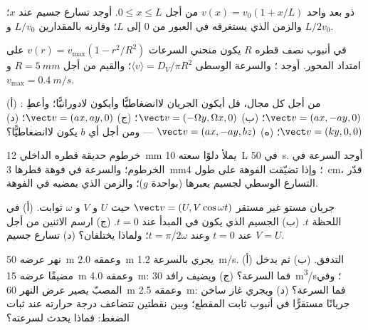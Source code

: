 \begin{exercise}[$\star$]\label{exo:b2:fluid-kinematics:2}
 ذو بعد واحد $v(x) = v_0(1 + x/L)$ من أجل $0 \le x \le L$.
أوجد تسارع جسيم عند $x$؛ والزمن الذي يستغرقه في العبور من $0$ إلى
$L$؛ وقارنه بالمقدارين $L/v_0$ و $L/2v_0$.
\end{exercise}

\begin{exercise}[$\star$]\label{exo:b2:fluid-kinematics:3}
في أنبوب نصف قطره $R$ يكون منحني السرعات $v(r) = v_{\max}(1 -
r^2/R^2)$ على امتداد المحور. أوجد ؛ والسرعة الوسطى $\langle v\rangle
= D_V/\pi R^2$؛ والقيم من أجل $R = \qty{5}{mm}$ و $v_{\max} = \qty{0.4}{m/s}$.
\end{exercise}

\begin{exercise}[$\star$]\label{exo:b2:fluid-kinematics:4}
من أجل كل مجال، قل أيكون الجريان لاانضغاطيًّا وأيكون
لادورانيًّا؛ وأعطِ : (أ) $\vect v = (ax, -ay, 0)$؛ (ب)
$\vect v = (-\Omega y, \Omega x, 0)$؛ (ج) $\vect v = (ax, ay, 0)$؛ (د) $\vect v =
(ky, 0, 0)$؛ (ه) $\vect v = (ax, -ay, bz)$ --- ومن أجل أي $b$ يكون
لاانضغاطيًّا؟
\end{exercise}

\begin{exercise}[$\star\star$]\label{exo:b2:fluid-kinematics:5}
خرطوم حديقة قطره الداخلي \qty{12}{mm} يملأ دلوًا سعته \qty{10}{L} في
\qty{50}{s}. أوجد السرعة في الخرطوم؛ والسرعة في فوهة قطرها
\qty{3}{mm}؛ وإذا تضيّقت الفوهة على طول \qty{4}{cm}، قدّر التسارع
الوسطي لجسيم يعبرها (بواحدة $g$)؛ والزمن الذي يمضيه في الفوهة.
\end{exercise}

\begin{exercise}[$\star\star$]\label{exo:b2:fluid-kinematics:6}
جريان مستو غير مستقر $\vect v = (U, V\cos\omega t)$ حيث $U$ و $V$ و $\omega$
ثوابت. (أ)  في اللحظة $t$. (ب)  الجسيم الذي
يكون في المبدأ عند $t = 0$. (ج) ارسم الاثنين من أجل $V = U$ عند $t = 0$
وعند $t = \pi/2\omega$؛ ولماذا يختلفان؟ (د) تسارع جسيم.
\end{exercise}

\begin{exercise}[$\star\star$]\label{exo:b2:fluid-kinematics:7}
نهر عرضه \qty{50}{m} وعمقه \qty{2.0}{m} يجري بالسرعة \qty{1.2}{m/s}. (أ)
التدفق. (ب) ثم يدخل مضيقًا عرضه \qty{15}{m} وعمقه \qty{4.0}{m}: فما
السرعة؟ (ج) ويضيف رافد \qty{30}{m^3/s}؛ وفي المصبّ يصير عرض النهر
\qty{60}{m} وعمقه \qty{2.5}{m}: فما السرعة؟ (د) ويجري غاز ساخن
جريانًا مستقرًّا في أنبوب ثابت المقطع؛ وبين نقطتين تتضاعف درجة
حرارته عند ثبات الضغط: فماذا يحدث لسرعته؟
\end{exercise}

